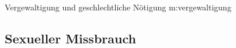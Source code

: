 {Vergewaltigung und geschlechtliche Nötigung}
{m:vergewaltigung}
{
}{}
% 




\subsection{Sexueller Missbrauch}



